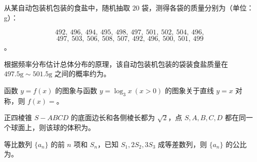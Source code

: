 \begin{question}
从某自动包装机包装的食盐中，随机抽取 $20$ 袋，测得各袋的质量分别为（单位：g）：

\nopagebreak[4]
\[
492,\ 496,\ 494,\ 495,\ 498,\ 497,\ 501,\ 502,\ 504,\ 496,
\]
\nopagebreak[4]
\[
497,\ 503,\ 506,\ 508,\ 507,\ 492,\ 496,\ 500,\ 501,\ 499
\]
。

根据频率分布估计总体分布的原理，该自动包装机包装的袋装食盐质量在 $497.5\mathrm{g}\sim501.5\mathrm{g}$ 之间的概率约为\gkblank{}。

\end{question}
\begin{question}
函数 $y=f(x)$ 的图象与函数 $y=\log_3x\ (x>0)$ 的图象关于直线 $y=x$ 对称，则 $f(x)=$\gkblank{}。

\end{question}
\begin{question}
正四棱锥 $S-ABCD$ 的底面边长和各侧棱长都为 $\sqrt2$，点 $S,A,B,C,D$ 都在同一个球面上，则该球的体积为\gkblank{}。

\end{question}
\begin{question}
等比数列 $\{a_n\}$ 的前 $n$ 项和 $S_n$，已知 $S_1,2S_2,3S_3$ 成等差数列，则 $\{a_n\}$ 的公比为\gkblank{}。

\end{question}

